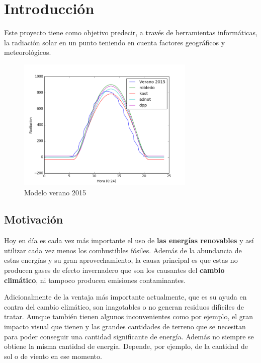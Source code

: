 \cleardoublepage

\chapter{Introducción}
\label{makereference}

Este proyecto tiene como objetivo predecir, a través de herramientas informáticas, la radiación solar en un punto teniendo en cuenta factores geográficos y meteorológicos.


\begin{figure}[htb]%
	
	\begin{center}
		\includegraphics[height=2.5in]{figures/verano2015.png}
		\caption{Modelo verano 2015}
	\end{center}
    
    \label{figure1}
\end{figure}

\section{Motivación}
\label{makereference1.1}

Hoy en día es cada vez más importante el uso de \textbf{las energías renovables} y así utilizar cada vez menos los combustibles fósiles.
Además de la abundancia de estas energías y su gran aprovechamiento, la causa principal es que estas no producen gases de efecto invernadero que son los causantes del \textbf{cambio climático}, ni tampoco producen emisiones contaminantes. 

Adicionalmente de la ventaja más importante actualmente, que es su ayuda en contra del cambio climático, son inagotables o no generan residuos difíciles de tratar. 
Aunque también tienen algunos inconvenientes como por ejemplo, el gran impacto visual que tienen y las grandes cantidades de terreno que se necesitan para poder conseguir una cantidad significante de energía. Además no siempre se obtiene la misma cantidad de energía. Depende, por ejemplo, de la cantidad de sol o de viento en ese momento.


